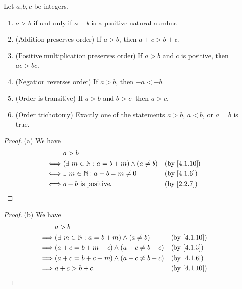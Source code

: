 \begin{lem}\label{4.1.11}
  Let \(a, b, c\) be integers.
  \begin{enumerate}
    \item \(a > b\) if and only if \(a - b\) is a positive natural number.
    \item (Addition preserves order) If \(a > b\), then \(a + c > b + c\).
    \item (Positive multiplication preserves order) If \(a > b\) and \(c\) is positive, then \(ac > bc\).
    \item (Negation reverses order) If \(a > b\), then \(-a < -b\).
    \item (Order is transitive) If \(a > b\) and \(b > c\), then \(a > c\).
    \item (Order trichotomy) Exactly one of the statements \(a > b\), \(a < b\), or \(a = b\) is true.
  \end{enumerate}
\end{lem}

\begin{proof}{(a)}
  We have
  \begin{align*}
         & a > b                                                                           \\
    \iff & (\exists\ m \in \N : a = b + m) \land (a \neq b) &  & \text{(by \cref{4.1.10})} \\
    \iff & \exists\ m \in \N : a - b = m \neq 0             &  & \by{4.1.6}                \\
    \iff & a - b \text{ is positive}.                       &  & \by{2.2.7}
  \end{align*}
\end{proof}

\begin{proof}{(b)}
  We have
  \begin{align*}
             & a > b                                                                           \\
    \implies & (\exists\ m \in \N : a = b + m) \land (a \neq b) &  & \text{(by \cref{4.1.10})} \\
    \implies & (a + c = b + m + c) \land (a + c \neq b + c)     &  & \by{4.1.3}                \\
    \implies & (a + c = b + c + m) \land (a + c \neq b + c)     &  & \by{4.1.6}                \\
    \implies & a + c > b + c.                                   &  & \text{(by \cref{4.1.10})}
  \end{align*}
\end{proof}

